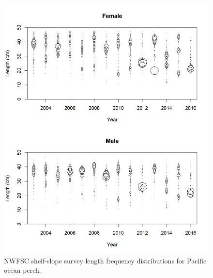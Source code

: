 \documentclass[12pt,]{article}
\begin{document}
\FloatBarrier

\begin{figure}
\centering
\includegraphics{Figures/NWFSCcombo_Lengths.png}
\caption{NWFSC shelf-slope survey length frequency distributions for
Pacific ocean perch. \label{fig:nw_Length}}
\end{figure}

\FloatBarrier
\end{document}
